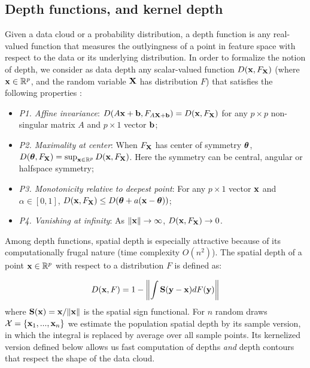 \documentclass[10pt, conference, compsocconf]{IEEEtran}
\begin{document}
\subsection{Depth functions, and kernel depth}
Given a data cloud or a probability distribution, a depth function is any real-valued function that measures the outlyingness of a point in feature space with respect to the data or its underlying distribution. In order to formalize the notion of depth, we consider as data depth any scalar-valued function $D({\bf{x}}, F_{\mathbf{X}})$ (where ${\bf{x}} \in \mathbb R^p$, and the random variable ${\mathbf{X}}$ has distribution $F$) that satisfies the following properties \cite{Liu90}:

\begin{itemize}
\item \textit{P1. Affine invariance}: $D(A{\bf{x}} + {\bf{b}}, F_{A{\mathbf{X}} + {\bf{b}}}) = D({\bf{x}}, F_{\mathbf{X}})$ for any $p \times p$ non-singular matrix $A$ and $p \times 1$ vector ${\bf{b}}$;

\item \textit{P2. Maximality at center}: When $F_{\mathbf{X}}$ has center of symmetry ${\boldsymbol{\theta}}$, $D({\boldsymbol{\theta}}, F_{\mathbf{X}}) = \sup_{{\bf{x}} \in \mathbb R^p} D({\bf{x}}, F_{\mathbf{X}})$. Here the symmetry can be central, angular or halfspace symmetry;

\item \textit{P3. Monotonicity relative to deepest point}: For any $p \times 1$ vector ${\bf{x}}$ and $\alpha \in [0,1]$, $D({\bf{x}}, F_{\mathbf{X}}) \leq D({\boldsymbol{\theta}} + a({\bf{x}} - {\boldsymbol{\theta}}))$;

\item \textit{P4. Vanishing at infinity}: As $\| {\bf{x}} \| \rightarrow \infty$, $D({\bf{x}}, F_{\mathbf{X}}) \rightarrow 0$.
\end{itemize}

Among depth functions, spatial depth is especially attractive because of its computationally frugal nature (time complexity $O(n^2)$). The spatial depth of a point ${\bf{x}} \in \mathbb{R}^p$ with respect to a distribution $F$ is defined as:

\begin{equation}
D({\bf{x}}, F) = 1 - \left\| \int {\mathbf{S}}({\bf{y}} - {\bf{x}}) dF({\bf{y}}) \right\|
\end{equation}
where ${\mathbf{S}}({\bf{x}}) = {\bf{x}} / \| {\bf{x}} \|$ is the spatial sign functional. For $n$ random draws $\mathcal{X} = \{ {\bf{x}}_1, ... , {\bf{x}}_n \}$ we estimate the population spatial depth by its sample version, in which the integral is replaced by average over all sample points. Its kernelized version \cite{Chen09} defined below allows us fast computation of depths \textit{and} depth contours that respect the shape of the data cloud.
\end{document}
